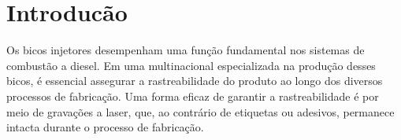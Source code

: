 \documentclass[conference]{IEEEtran}
\begin{document}



\section{Introducão}

Os bicos injetores desempenham uma função fundamental nos sistemas de combustão a diesel. Em uma multinacional especializada na produção desses bicos, é essencial assegurar a rastreabilidade do produto ao longo dos diversos processos de fabricação. Uma forma eficaz de garantir a rastreabilidade é por meio de gravações a laser, que, ao contrário de etiquetas ou adesivos, permanece intacta durante o processo de fabricação.
\end{document}
